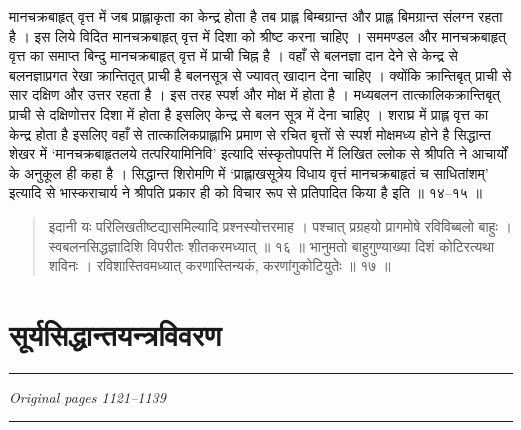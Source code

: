 \documentclass[11pt,a4paper]{article}
\newcommand{\dev}[1]{{\devanagarifont #1}}
\newenvironment{shloka}{\begin{quote}\devanagarifont}{\end{quote}}
\newenvironment{hindicom}{\devanagarifont}{\par}
\begin{document}
\begin{hindicom}
\dev{मानचक्रबाहृत् वृत्त में जब प्राह्लाकृता का केन्द्र होता है तब प्राह्ल बिम्बग्रान्त और प्राह्ल}
\dev{बिमग्रान्त संलग्न रहता है । इस लिये विदित मानचक्रबाहृत् वृत्त में दिशा को श्रीष्ट करना}
\dev{चाहिए । सममण्डल और मानचक्रबाहृत् वृत्त का समाप्त बिन्दु मानचक्रबाहृत् वृत्त में प्राची चिह्न है ।}
\dev{वहाँ से बलनज्ञा दान देने से केन्द्र से बलनज्ञाप्रगत रेखा क्रान्तितृत् प्राची है बलनसूत्र से}
\dev{ज्यावत् खादान देना चाहिए । क्योंकि क्रान्तिबृत् प्राची से सार दक्षिण और उत्तर रहता है । इस}
\dev{तरह स्पर्श और मोक्ष में होता है । मध्यबलन तात्कालिकक्रान्तिबृत् प्राची से दक्षिणोत्तर}
\dev{दिशा में होता है इसलिए केन्द्र से बलन सूत्र में देना चाहिए । शराघ्र में प्राह्ल वृत्त का केन्द्र}
\dev{होता है इसलिए वहाँ से तात्कालिकप्राह्लाभि प्रमाण से रचित बृत्तों से स्पर्श मोक्षमध्य होने है}
\dev{सिद्धान्त शेखर में `मानचक्रबाहृतलये तत्परियामिनिवि' इत्यादि संस्कृतोपपत्ति में लिखित}
\dev{ल्लोक से श्रीपति ने आचार्यों के अनुकूल ही कहा है । सिद्धान्त शिरोमणि में `प्राह्लाखसूत्रेय}
\dev{विधाय वृत्तं मानचक्रबाहृतं च साधितांशम्' इत्यादि से भास्कराचार्य ने श्रीपति प्रकार ही को}
\dev{विचार रूप से प्रतिपादित किया है इति ॥ १४--१५ ॥}
\end{hindicom}

\vspace{0.5cm}
\begin{shloka}
\dev{इदानी यः परिलिखतीष्टद्यासमिल्यादि प्रश्नस्योत्तरमाह ।}
\dev{पश्चात् प्रग्रहयो प्रागमोषे रविविब्बलो बाहुः ।}
\dev{स्वबलनसिद्धज्ञादिशि विपरीतः शीतकरमध्यात् ॥ १६ ॥}
\dev{भानुमतो बाहुगुण्याख्या दिशं कोटिरत्यथा शविनः ।}
\dev{रविशास्तिवमध्यात् करणास्तिन्यकं, करणांगुकोटियुतेः ॥ १७ ॥}
\end{shloka}

\newpage

\section*{\dev{सूर्यसिद्धान्तयन्त्रविवरण}}

\noindent\rule{\textwidth}{0.6pt}
\begin{center}
\textit{Original pages 1121--1139}
\end{center}
\noindent\rule{\textwidth}{0.6pt}
\vspace{0.5cm}
\end{document}
